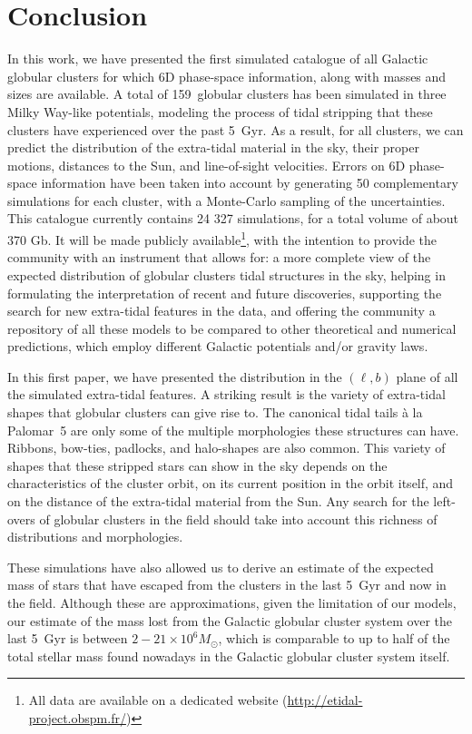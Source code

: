 \section{Conclusion}
    In this work, we have presented the first simulated catalogue of  all Galactic globular clusters for which 6D phase-space information, along with masses and sizes are available. A total of 159~globular clusters has been simulated in three Milky Way-like potentials, modeling  the process of tidal stripping that these clusters have experienced over the past 5~Gyr.  As a result, for all clusters, we can predict the distribution of the extra-tidal material in the sky, their proper motions,  distances to the Sun, and line-of-sight velocities. Errors on 6D phase-space  information have been taken into account by generating 50 complementary simulations for each cluster, with a Monte-Carlo sampling of the uncertainties.  This catalogue currently contains 24 327 simulations, for a total volume of about 370 Gb. It will be made publicly available\footnote{All data are available on a dedicated website (\url{http://etidal-project.obspm.fr/})}, with the intention to provide the community with an instrument that allows for:  a more complete view of the expected distribution of globular clusters tidal structures in the sky,  helping in formulating the interpretation of recent and future discoveries,  supporting the search for new extra-tidal features in the data, and offering the community a repository of all these models to be compared to other theoretical and numerical predictions, which employ different Galactic potentials and/or gravity laws.

    In this first paper, we have presented the distribution in the $(\ell, b)$ plane of all the simulated extra-tidal features. A striking result is the variety of extra-tidal shapes that globular clusters can give rise to. The canonical tidal tails \`a la Palomar~5 are only some of the multiple morphologies these structures can have. Ribbons, bow-ties, padlocks, and halo-shapes are also common. This variety of shapes that these stripped stars can show in the sky depends on the characteristics of the cluster orbit, on its current position in the orbit itself, and on the distance of the extra-tidal material from the Sun. Any search for the left-overs of globular clusters in the field should take into account this richness of distributions and morphologies. 

    These simulations have also allowed us to derive an estimate of the expected mass of stars that have escaped from the clusters in the last 5~Gyr and now in the field. Although these are approximations, given the limitation of our models, our estimate of the mass lost from the Galactic globular cluster system over the last 5~Gyr is between $2-21\times 10^6 M_{\odot}$, which is comparable to up to half of the total stellar mass found nowadays in the Galactic globular cluster system itself. 


